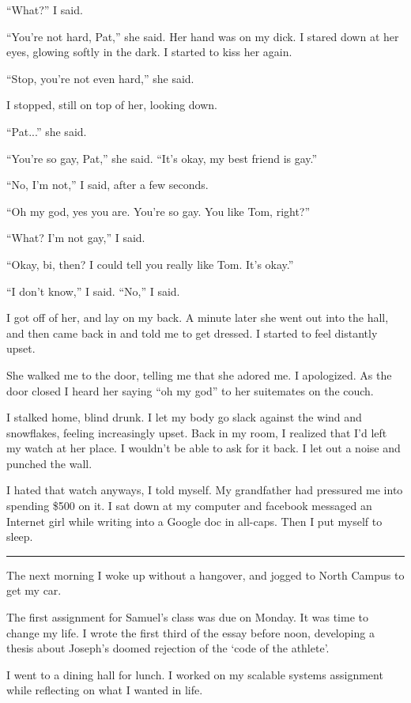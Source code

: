 ``What?'' I said.

``You're not hard, Pat,'' she said.  Her hand was on my dick.  I stared down at
her eyes, glowing softly in the dark.  I started to kiss her again.

``Stop, you're not even hard,'' she said.

I stopped, still on top of her, looking down.

``Pat...'' she said.

``You're so gay, Pat,'' she said.  ``It's okay, my best friend is gay.''

``No, I'm not,'' I said, after a few seconds.

``Oh my god, yes you are.  You're so gay.  You like Tom, right?''

``What?  I'm not gay,'' I said.

``Okay, bi, then?  I could tell you really like Tom.  It's okay.''

``I don't know,'' I said.  ``No,'' I said.

I got off of her, and lay on my back.  A minute later she went out into the
hall, and then came back in and told me to get dressed.  I started to feel
distantly upset.

She walked me to the door, telling me that she adored me.  I apologized.  As the
door closed I heard her saying ``oh my god'' to her suitemates on the couch.

I stalked home, blind drunk.  I let my body go slack against the wind and
snowflakes, feeling increasingly upset.  Back in my room, I realized that I'd
left my watch at her place.  I wouldn't be able to ask for it back.  I let out a
noise and punched the wall. 

I hated that watch anyways, I told myself.  My grandfather had pressured me into
spending \$500 on it.   I sat down at my computer and facebook messaged an
Internet girl while writing into a Google doc in all-caps.  Then I put myself to
sleep.

\plainfancybreak{12pt}{2}{}

The next morning I woke up without a hangover, and jogged to North Campus to get
my car.  


The first assignment for Samuel's class was due on Monday.  It was time to
change my life.  I wrote the first third of the essay before noon, developing a
thesis about Joseph's doomed rejection of the `code of the athlete'.

I went to a dining hall for lunch.  I worked on my scalable systems assignment
while reflecting on what I wanted in life.

